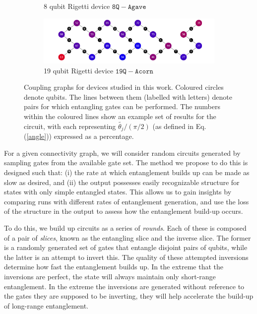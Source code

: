 \documentclass[aps,prl,twocolumn,showpacs,preprintnumbers]{revtex4-1}
\begin{document}
\begin{figure}
\begin{subfigure}[b]{0.5\columnwidth}
       	\caption{8 qubit Rigetti device $\mathtt{8Q-Agave}$}
    \end{subfigure}
    \begin{subfigure}[b]{\columnwidth}
        \includegraphics[width=\textwidth]{figures/acorn.png}
        \caption{19 qubit Rigetti device $\mathtt{19Q-Acorn}$}
    \end{subfigure}
    \caption{Coupling graphs for devices studied in this work. Coloured circles denote qubits. The lines between them (labelled with letters) denote pairs for which entangling gates can be performed. The numbers within the coloured lines show an example set of results for the circuit, with each representing $\tilde{\theta_j} / (\pi/2)$ (as defined in Eq. (\ref{angle})) expressed as a percentage.}\label{fig:graphs}
\end{figure}

For a given connectivity graph, we will consider random circuits generated by sampling gates from the available gate set. The method we propose to do this is designed such that: (i) the rate at which entanglement builds up can be made as slow as desired, and (ii) the output possesses easily recognizable structure for states with only simple entangled states. This allows us to gain insights by comparing runs with different rates of entanglement generation, and use the loss of the structure in the output to assess how the entanglement build-up occurs.

To do this, we build up circuits as a series of \textit{rounds}. Each of these is composed of a pair of \textit{slices}, known as the entangling slice and the inverse slice. The former is a randomly generated set of gates that entangle disjoint pairs of qubits, while the latter is an attempt to invert this. The quality of these attempted inversions determine how fast the entanglement builds up. In the extreme that the inversions are perfect, the state will always maintain only short-range entanglement. In the extreme the inversions are generated without reference to the gates they are supposed to be inverting, they will help accelerate the build-up of long-range entanglement.
\end{document}
